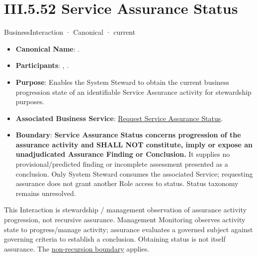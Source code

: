 \section*{III.5.52 Service Assurance Status}
\label{navigation:III.5.52}

\label{element:6bad04918445465cb350c3252af73377}
{\small BusinessInteraction · Canonical · current}\par

\begin{itemize}


\item \textbf{Canonical Name}: \texttt{}.

\item \textbf{Participants}: \texttt{}, \texttt{}.

\item \textbf{Purpose}: Enables the System Steward to obtain the current business progression state of an identifiable Service Assurance activity for stewardship purposes.

\item \textbf{Associated Business Service}: \href{\detokenize{../../../../../../../../docs/markdown/03-business-architecture/behaviours/health-service-assurance.md#request-service-assurance-status}}{Request Service Assurance Status}.

\item \textbf{Boundary}: \textbf{Service Assurance Status concerns progression of the assurance activity and SHALL NOT constitute, imply or expose an unadjudicated Assurance Finding or Conclusion.} It supplies no provisional/predicted finding or incomplete assessment presented as a conclusion. Only System Steward consumes the associated Service; requesting assurance does not grant another Role access to status. Status taxonomy remains unresolved.

\end{itemize}


This Interaction is stewardship / management observation of assurance activity progression, not recursive assurance. Management Monitoring observes activity state to progress/manage activity; assurance evaluates a governed subject against governing criteria to establish a conclusion. Obtaining status is not itself assurance. The \href{\detokenize{../../../../../../../../docs/markdown/03-business-architecture/behaviours/health-service-assurance.md#assurance-non-recursion-boundary}}{non-recursion boundary} applies.


